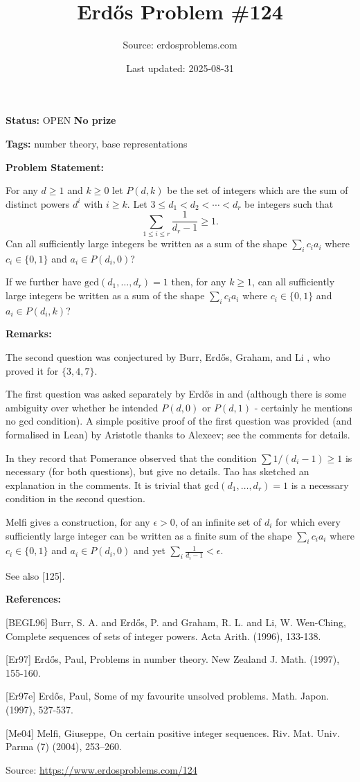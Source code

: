 \documentclass{article}
\title{Erd\H{o}s Problem \#124}
\date{Last updated: 2025-08-31}
\author{Source: erdosproblems.com}
\begin{document}
\maketitle

\noindent\textbf{Status:} OPEN \quad \textbf{No prize}

\noindent\textbf{Tags:} number theory, base representations

\medskip
\noindent\textbf{Problem Statement:}

For any $d\geq 1$ and $k\geq 0$ let $P(d,k)$ be the set of integers which are the sum of distinct powers $d^i$ with $i\geq k$. Let $3\leq d_1<d_2<\cdots <d_r$ be integers such that\[\sum_{1\leq i\leq r}\frac{1}{d_r-1}\geq 1.\]Can all sufficiently large integers be written as a sum of the shape $\sum_i c_ia_i$ where $c_i\in \{0,1\}$ and $a_i\in P(d_i,0)$? 

If we further have $\mathrm{gcd}(d_1,\ldots,d_r)=1$ then, for any $k\geq 1$, can all sufficiently large integers be written as a sum of the shape $\sum_i c_ia_i$ where $c_i\in \{0,1\}$ and $a_i\in P(d_i,k)$?

\bigskip
\noindent\textbf{Remarks:}

The second question was conjectured by Burr, Erd\H{o}s, Graham, and Li \cite{BEGL96}, who proved it for $\{3,4,7\}$.

The first question was asked separately by Erd\H{o}s in \cite{Er97} and \cite{Er97e} (although there is some ambiguity over whether he intended $P(d,0)$ or $P(d,1)$ - certainly he mentions no gcd condition). A simple positive proof of the first question was provided (and formalised in Lean) by Aristotle thanks to Alexeev; see the comments for details.

In \cite{BEGL96} they record that Pomerance observed that the condition $\sum 1/(d_i-1)\geq 1$ is necessary (for both questions), but give no details. Tao has sketched an explanation in the comments. It is trivial that $\mathrm{gcd}(d_1,\ldots,d_r)=1$ is a necessary condition in the second question. 

Melfi \cite{Me04} gives a construction, for any $\epsilon>0$, of an infinite set of $d_i$ for which every sufficiently large integer can be written as a finite sum of the shape $\sum_i c_ia_i$ where $c_i\in \{0,1\}$ and $a_i\in P(d_i,0)$ and yet $\sum_{i}\frac{1}{d_i-1}<\epsilon$.

See also [125].

\bigskip
\noindent\textbf{References:}

[BEGL96] Burr, S. A. and Erd\H{o}s, P. and Graham, R. L. and Li, W. Wen-Ching, Complete sequences of sets of integer powers. Acta Arith. (1996), 133-138.
 
 [Er97] Erd\H{o}s, Paul, Problems in number theory. New Zealand J. Math. (1997), 155-160.
 
 [Er97e] Erd\H{o}s, Paul, Some of my favourite unsolved problems. Math. Japon. (1997), 527-537.
 
 [Me04] Melfi, Giuseppe, On certain positive integer sequences. Riv. Mat. Univ. Parma (7) (2004), 253--260.

\bigskip
\noindent\small{Source: \url{https://www.erdosproblems.com/124}}
\end{document}
